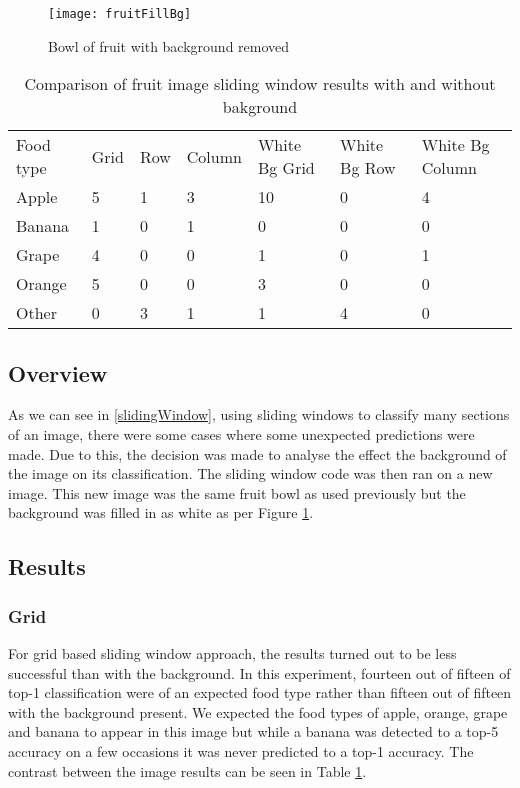 \begin{figure}
    \texttt{[image: fruitFillBg]}
    \caption{Bowl of fruit with background removed}
    \label{fig:filledFruit}
\end{figure}

\begin{table}[]
    \centering
    \caption{Comparison of fruit image sliding window results with and without
    bakground}
    \label{comparisionFruitTable}
    \begin{tabular}{lllllll}
        Food type & Grid & Row & Column & White Bg Grid & White Bg Row & White Bg Column \\
        Apple     & 5    & 1   & 3      & 10          & 0          & 4
        \\
        Banana    & 1    & 0   & 1      & 0           & 0          & 0
        \\
        Grape     & 4    & 0   & 0      & 1           & 0          & 1
        \\
        Orange    & 5    & 0   & 0      & 3           & 0          & 0
        \\
        Other     & 0    & 3   & 1      & 1           & 4          & 0            
    \end{tabular}
\end{table}

\subsection*{Overview}
As we can see in \ref{slidingWindow}, using sliding windows to classify many sections
of an image, there were some cases where some unexpected predictions were made.
Due to this, the decision was made to analyse the effect the background of the
image on its classification. The sliding window code was then ran on a new
image. This new image was the same fruit bowl as used previously but the
background was filled in as white as per Figure \ref{fig:filledFruit}.

\subsection*{Results}
\subsubsection*{Grid}
For grid based sliding window approach, the results turned out to be less
successful than with the background. In this experiment, fourteen out of fifteen
of top-1 classification were of an expected food type rather than fifteen out of
fifteen with the background present. We expected the food types of apple,
orange, grape and banana to appear in this image but while a banana was detected
to a top-5 accuracy on a few occasions it was never predicted to a top-1
accuracy. The contrast between the image results can be seen in Table
\ref{comparisionFruitTable}.

